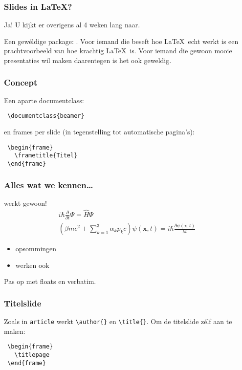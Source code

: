 \begin{frame}
  \frametitle{Slides in \LaTeX?}

  Ja! U kijkt er overigens al 4 weken lang naar.

  Een gew\'eldige package: . Voor iemand die beseft hoe \LaTeX\ echt werkt is  een prachtvoorbeeld van hoe krachtig \LaTeX\ is. Voor iemand die gewoon mooie presentaties wil maken daarentegen is het ook geweldig.
\end{frame}

\begin{frame}[fragile]
  \frametitle{Concept}

  Een aparte documentclass:

  \begin{verbatim}
 \documentclass{beamer}
  \end{verbatim}

  en frames per slide (in tegenstelling tot automatische pagina's):
  \begin{verbatim}
 \begin{frame}
   \frametitle{Titel}
 \end{frame}
  \end{verbatim}
\end{frame}

\begin{frame}
  \frametitle{Alles wat we kennen\ldots}

  \small
  werkt gewoon!
  \begin{gather}
    i\hbar\frac{\partial}{\partial t}\Psi=\hat{H}\Psi \\
    \left( \beta mc^2+\sum_{k=1}^3\alpha_k p_k c \right)\psi(\mathbf{x},t)=i\hbar\frac{\partial\psi(\mathbf{x},t)}{\partial t}
  \end{gather}
  \begin{itemize}
    \item opsommingen
    \item werken ook
  \end{itemize}
  Pas op met floats en verbatim.
\end{frame}

\begin{frame}[fragile]
  \frametitle{Titelslide}

  Zoals in \verb|article| werkt \texttt{\textcolor{uagreen}{\textbackslash author}\{\}} en \texttt{\textcolor{uagreen}{\textbackslash title}\{\}}. Om de titelslide z\'elf aan te maken:
  \begin{verbatim}
 \begin{frame}
   \titlepage
 \end{frame}
\end{verbatim}
\end{frame}

